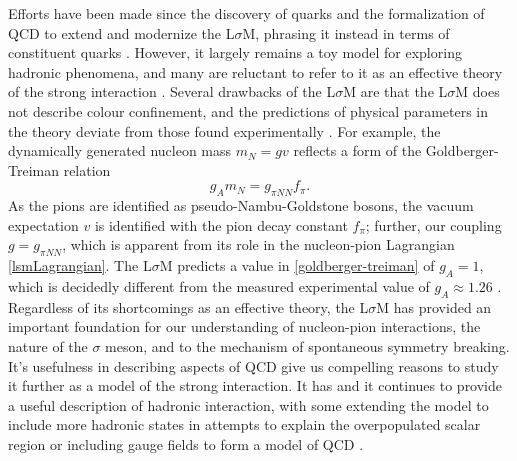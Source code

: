 \documentclass[aps,prd,onecolumn,showpacs,amsmath,amssymb,nofootinbib]{revtex4} \pdfoutput=1
\newcommand{\lsm}{L$\sigma$M}
\begin{document}
Efforts have been made since the discovery of quarks and the formalization of QCD to extend and modernize the {\lsm}, phrasing it instead in terms of constituent quarks \cite{Levy1967,Cabibbo1970,Delbourgo1995,Delbourgo1998}. However, it largely remains a toy model for exploring hadronic phenomena, and many are reluctant to refer to it as an effective theory of the strong interaction \cite{Donoghue1992,Ecker1994,Parganlija2017}. Several drawbacks of the {\lsm} are that the {\lsm} does not describe colour confinement, and the predictions of physical parameters in the theory deviate from those found experimentally \cite{Ecker1994}. For example, the dynamically generated nucleon mass $m_N = gv$ reflects a form of the Goldberger-Treiman relation
\begin{equation}
    \label{goldberger-treiman}
    g_{A} m_N = g_{\pi N N}f_\pi.
\end{equation}
As the pions are identified as pseudo-Nambu-Goldstone bosons, the vacuum expectation $v$ is identified with the pion decay constant $f_\pi$; further, our coupling $g = g_{\pi N N }$, which is apparent from its role in the nucleon-pion Lagrangian \eqref{lsmLagrangian}. The {\lsm} predicts a value in \eqref{goldberger-treiman} of $g_{A} = 1$, which is decidedly different from the measured experimental value of $g_{A} \approx 1.26$ \cite{PDG2018}.
Regardless of its shortcomings as an effective theory, the {\lsm} has provided an important foundation for our understanding of nucleon-pion interactions, the nature of the $\sigma$ meson, and to the mechanism of spontaneous symmetry breaking. It's usefulness in describing aspects of QCD give us compelling reasons to study it further as a model of the strong interaction. It has and it continues to provide a useful description of hadronic interaction, with some extending the model to include more hadronic states in attempts to explain the overpopulated scalar region \cite{Tornqvist2002,Parganlija2017, Fariborz2018} or including gauge fields to form a model of QCD \cite{Fariborz2009}.
\end{document}
